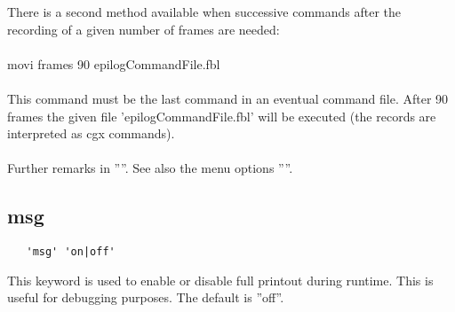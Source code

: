 \documentclass{article}
\begin{document}
There is a second method available when successive commands after the recording of a given number of frames are needed:\\\\
movi frames 90 epilogCommandFile.fbl\\\\
This command must be the last command in an eventual command file. After 90 frames the given file 'epilogCommandFile.fbl' will be executed (the records are interpreted as cgx commands).\\\\
Further remarks in ''''. See also the menu options ''''. 

\subsection{\label{msg}msg}
\begin{verbatim}
   'msg' 'on|off' 
\end{verbatim}
This keyword is used to enable or disable full printout during runtime. This is useful for debugging purposes. The default is ''off''.
\end{document}

